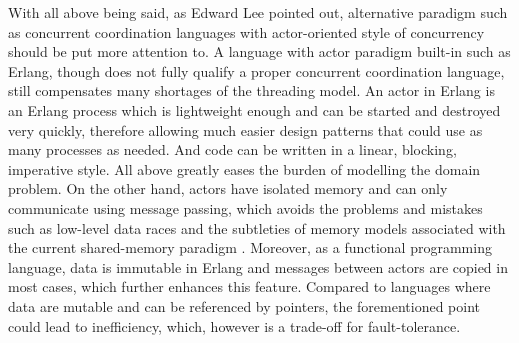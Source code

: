With all above being said, as Edward Lee \cite{Lee:2006:PT:1137232.1137289} pointed out, alternative paradigm such as concurrent coordination languages with actor-oriented style of concurrency should be put more attention to. A language with actor paradigm built-in such as Erlang, though does not fully qualify a proper concurrent coordination language, still compensates many shortages of the threading model. An actor in Erlang is an Erlang process which is lightweight enough and can be started and destroyed very quickly, therefore allowing 
much easier design patterns that could use as many processes as needed. And code can be written in a linear, blocking, imperative style. All above greatly eases the burden of modelling the domain problem. On the other hand, actors have isolated memory and can only communicate using message passing, which avoids the problems and mistakes such as low-level data races and the subtleties of memory models associated with the current shared-memory paradigm \cite{UCAM-CL-TR-769}. Moreover, as a functional programming language, data is immutable in Erlang and messages between actors are copied in most cases, which further enhances this feature. Compared to languages where data are mutable and can be referenced by pointers, the 
forementioned point could lead to inefficiency, which, however is a trade-off for fault-tolerance.

